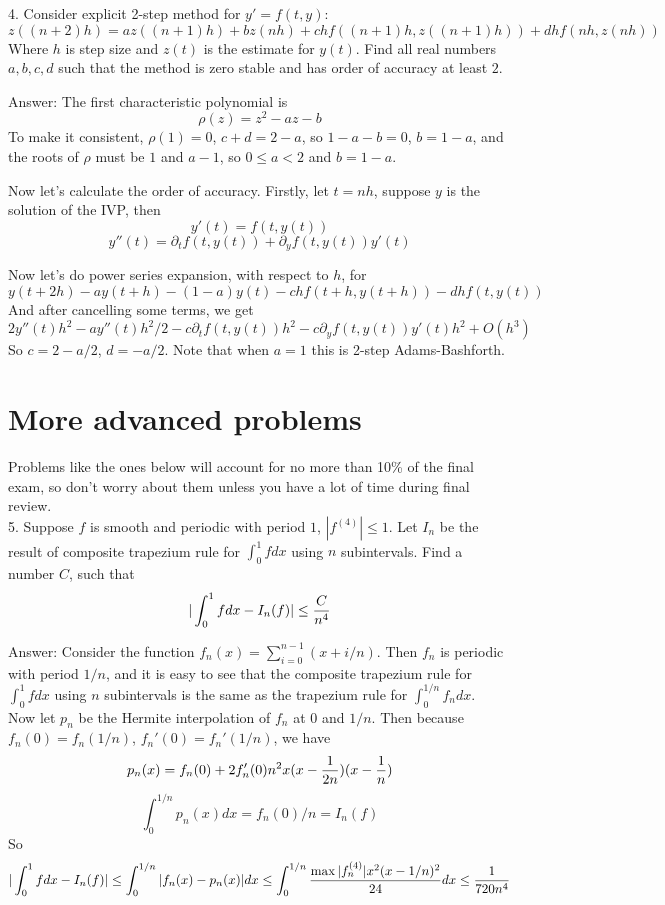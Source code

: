 \documentclass[20pt]{article} %
\theoremstyle{break}
\begin{document}
4. Consider explicit 2-step method for $y'=f(t, y)$:
\[z((n+2)h)=az((n+1)h)+bz(nh)+chf((n+1)h, z((n+1)h))+dhf(nh, z(nh))\]
Where $h$ is step size and $z(t)$ is the estimate for $y(t)$. Find all real numbers $a, b, c, d$ such that the method is zero stable and has order of accuracy at least $2$.

Answer: The first characteristic polynomial is
\[\rho(z)=z^2-az-b\]
To make it consistent, $\rho(1)=0$, $c+d=2-a$, so $1-a-b=0$, $b=1-a$, and the roots of $\rho$ must be $1$ and $a-1$, so $0\leq a<2$ and $b=1-a$.

Now let's calculate the order of accuracy. Firstly, let $t=nh$, suppose $y$ is the solution of the IVP, then
\[y'(t)=f(t, y(t))\]
\[y''(t)=\partial_tf(t, y(t))+\partial_yf(t, y(t))y'(t)\]

Now let's do power series expansion, with respect to $h$, for
\[y(t+2h)-ay(t+h)-(1-a)y(t)-chf(t+h, y(t+h))-dhf(t, y(t))\]
And after cancelling some terms, we get
\[2y''(t)h^2-ay''(t)h^2/2-c\partial_t f(t, y(t))h^2-c\partial_y f(t, y(t))y'(t)h^2+O(h^3)\]
So $c=2-a/2$, $d=-a/2$. Note that when $a=1$ this is 2-step Adams-Bashforth.\\


\section{More advanced problems}

Problems like the ones below will account for no more than 10\% of the final exam, so don't worry about them unless you have a lot of time during final review.\\

5. Suppose $f$ is smooth and periodic with period $1$, $|f^{(4)}|\leq 1$. Let $I_n$ be the result of composite trapezium rule for $\int_0^1fdx$ using $n$ subintervals. Find a number $C$, such that
\[|\int_0^1fdx-I_n(f)|\leq {C\over n^4}\]

Answer: Consider the function $f_n(x)=\sum_{i=0}^{n-1}(x+i/n)$. Then $f_n$ is periodic with period $1/n$, and it is easy to see that the composite trapezium rule for $\int_0^1fdx$ using $n$ subintervals is the same as the trapezium rule for $\int_0^{1/n}f_ndx$.\\

Now let $p_n$ be the Hermite interpolation of $f_n$ at $0$ and $1/n$. Then because $f_n(0)=f_n(1/n)$, $f_n'(0)=f_n'(1/n)$, we have
\[p_n(x)=f_n(0)+2f'_n(0)n^2x(x-{1\over 2n})(x-{1\over n})\]
\[\int_0^{1/n}p_n(x)dx=f_n(0)/n=I_n(f)\]
So
\[|\int_0^1fdx-I_n(f)|\leq \int_0^{1/n}|f_n(x)-p_n(x)|dx\leq \int_0^{1/n}{\max|f_n^{(4)}|x^2(x-1/n)^2\over 24}dx\leq {1\over 720n^4}\]
\end{document}
